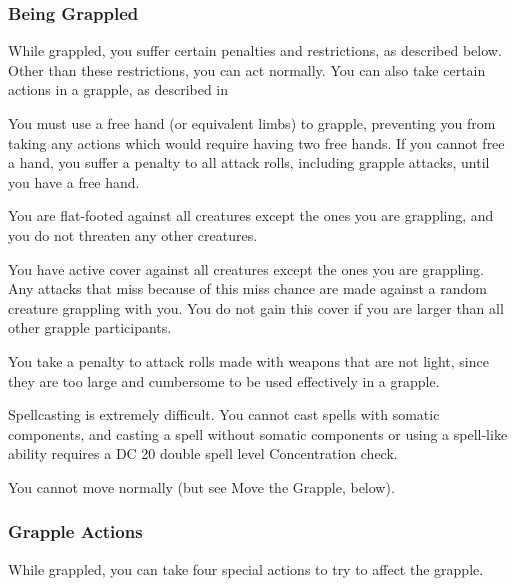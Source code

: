\subsubsection{Being Grappled}
While grappled, you suffer certain penalties and restrictions, as described below. Other than these restrictions, you can act normally. You can also take certain actions in a grapple, as described in  
\begin{itemize*}
    \item You must use a free hand (or equivalent limbs) to grapple, preventing you from taking any actions which would require having two free hands. If you cannot free a hand, you suffer a  penalty to all attack rolls, including grapple attacks, until you have a free hand.
    \item You are flat-footed against all creatures except the ones you are grappling, and you do not threaten any other creatures.
    \item You have active cover against all creatures except the ones you are grappling. Any attacks that miss because of this miss chance are made against a random creature grappling with you. You do not gain this cover if you are larger than all other grapple participants.
    \item You take a  penalty to attack rolls made with weapons that are not light, since they are too large and cumbersome to be used effectively in a grapple.
    \item Spellcasting is extremely difficult. You cannot cast spells with somatic components, and casting a spell without somatic components or using a spell-like ability requires a DC 20 \add double spell level Concentration check.
    \item You cannot move normally (but see Move the Grapple, below).
\end{itemize*}

\subsubsection{Grapple Actions}
While grappled, you can take four special actions to try to affect the grapple.

